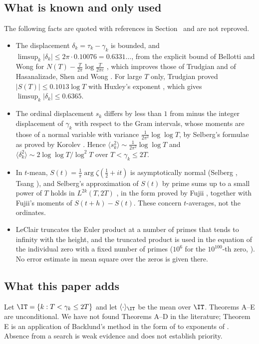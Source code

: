 \subsection{What is known and only used}
\label{subsec:known_intro}
The following facts are quoted with references in Section~ and are not reproved.
\begin{itemize}[leftmargin=1.6em]
\item The displacement $\delta_k=\tau_k-\gamma_k$ is bounded, and $\limsup_k|\delta_k|\le2\pi\cdot0.10076=0.6331\ldots$, from the explicit bound of Bellotti and Wong for $N(T)-\frac T{2\pi}\log\frac T{2\pi e}$ \cite{BellottiWong2025}, which improves those of Trudgian \cite{Trudgian2014} and of Hasanalizade, Shen and Wong \cite{HasanalizadeShenWong2022}. For large $T$ only, Trudgian proved $|S(T)|\le0.1013\log T$ with Huxley's exponent \cite[\S5 of the preprint]{Trudgian2010}, which gives $\limsup_k|\delta_k|\le0.6365$.
\item The ordinal displacement $s_k$ differs by less than $1$ from minus the integer displacement of $\gamma_k$ with respect to the Gram intervals, whose moments are those of a normal variable with variance $\frac1{2\pi^2}\log\log T$, by Selberg's formulae as proved by Korolev \cite{Korolev2012,Korolev2011}. Hence $\langle s_k^2\rangle\sim\frac1{2\pi^2}\log\log T$ and $\langle\delta_k^2\rangle\sim2\log\log T/\log^2T$ over $T<\gamma_k\le2T$.
\item In $t$-mean, $S(t)=\frac1\pi\arg\zeta(\frac12+it)$ is asymptotically normal (Selberg \cite{Selberg1946a}, Tsang \cite{Tsang1984}), and Selberg's approximation of $S(t)$ by prime sums up to a small power of $T$ holds in $L^{2k}(T,2T)$ \cite{Selberg1946a,Selberg1946b}, in the form proved by Fujii \cite[\S3]{Fujii1974}, together with Fujii's moments of $S(t+h)-S(t)$. These concern $t$-averages, not the ordinates.
\item LeClair \cite[Sect.~3]{LeClair2021} truncates the Euler product at a number of primes that tends to infinity with the height, and the truncated product is used in the equation of the individual zero with a fixed number of primes ($10^6$ for the $10^{100}$-th zero, \cite[\S XXI, Note added 7]{FrancaLeClair2024}). No error estimate in mean square over the zeros is given there.
\end{itemize}

\subsection{What this paper adds}
\label{subsec:main_results}
Let $\IT=\{k:T<\gamma_k\le2T\}$ and let $\langle\cdot\rangle_{\IT}$ be the mean over $\IT$. Theorems A--E are unconditional. We have not found Theorems A--D in the literature; Theorem E is an application of Backlund's method in the form of \cite{Trudgian2010,Trudgian2014,BellottiWong2025} to exponents of \cite{Bourgain2017,Ivic1985}. Absence from a search is weak evidence and does not establish priority.

